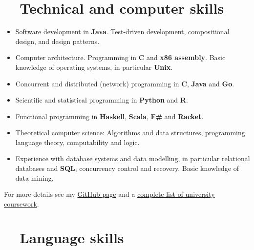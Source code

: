 \documentclass[article, a4paper, 11pt, oneside]{memoir}
\newcommand{\myitem}[3]{\item[#1] #2 \par \small #3 \par\normalsize}
\begin{document}
    
    


\section[Technical and computer skills]{\faCode~~Technical and computer skills}

\newcommand{\lan}[1]{\textsf{\textbf{\textcolor{linkcolor}{#1}}}}

\begin{itemize}[itemsep=0em,label={\faAngleDoubleRight}]
    \item Software development in \lan{Java}. Test-driven development, compositional design, and design patterns.
    
    \item Computer architecture. Programming in \lan{C} and \lan{x86 assembly}. Basic knowledge of operating systems, in particular \lan{Unix}.
    
    \item Concurrent and distributed (network) programming in \lan{C}, \lan{Java} and \lan{Go}.

    \item Scientific and statistical programming in \lan{Python} and \lan{R}.
    
    \item Functional programming in \lan{Haskell}, \lan{Scala}, \lan{F\#} and \lan{Racket}.
    
    \item Theoretical computer science: Algorithms and data structures, programming language theory, computability and logic.
    
    \item Experience with database systems and data modelling, in particular relational databases and \lan{SQL}, concurrency control and recovery. Basic knowledge of data mining.
\end{itemize}
%
For more details see my \href{https://github.com/dnhansen/}{GitHub page} and a \href{https://dnhansen.github.io/coursework}{complete list of university coursework}.


\section[Language skills]{\faLanguage~~Language skills} %
\end{document}

